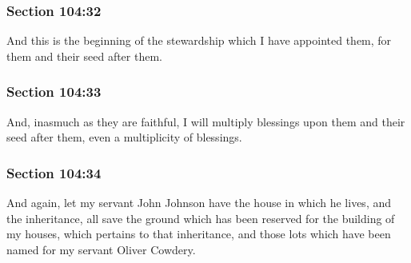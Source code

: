	\subsubsection{Section 104:32} %
		\label{DC104-32}

		And this is the beginning of the stewardship which I have appointed them, for them and their seed after them.


	\subsubsection{Section 104:33} %
		\label{DC104-33}

		And, inasmuch as they are faithful, I will multiply blessings upon them and their seed after them, even a multiplicity of blessings.


	\subsubsection{Section 104:34} %
		\label{DC104-34}

		And again, let my servant John Johnson have the house in which he lives, and the inheritance, all save the ground which has been reserved for the building of my houses, which pertains to that inheritance, and those lots which have been named for my servant Oliver Cowdery.


